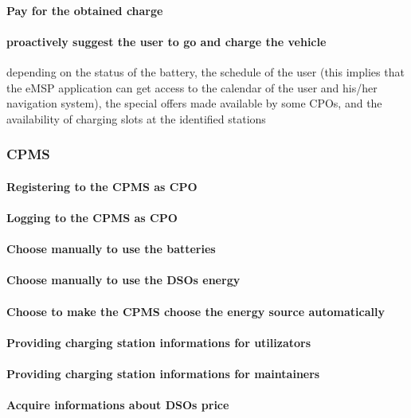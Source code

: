 \paragraph{Pay for the obtained charge}

\paragraph{proactively suggest the user to go and charge the vehicle}
depending on the status of the
battery, the schedule of the user (this implies that the eMSP application can get access to the
calendar of the user and his/her navigation system), the special offers made available by some
CPOs, and the availability of charging slots at the identified stations

\subsubsection{\ac{CPMS}}
\paragraph{Registering to the \ac{CPMS} as \ac{CPO}}
\paragraph{Logging to the \ac{CPMS} as \ac{CPO}}
\paragraph{Choose manually to use the batteries}
\paragraph{Choose manually to use the \acp{DSO} energy}
\paragraph{Choose to make the \ac{CPMS} choose the energy source automatically}
\paragraph{Providing charging station informations for utilizators}
\paragraph{Providing charging station informations for maintainers}
\paragraph{Acquire informations about \acp{DSO} price}



